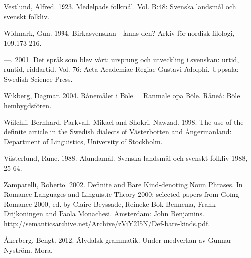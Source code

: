 Vestlund, Alfred. 1923. Medelpads folkmål. Vol. B:48: Svenska landsmål och svenskt folkliv.


Widmark, Gun. 1994. Birkasvenskan - fanns den? Arkiv för nordisk filologi, 109.173-216.


—. 2001. Det språk som blev vårt: ursprung och utveckling i svenskan: urtid, runtid, riddartid. Vol. 76: Acta Academiae Regiae Gustavi Adolphi. Uppsala: Swedish Science Press.


Wikberg, Dagmar. 2004. Rånemålet i Böle = Ranmale opa Böle. Råneå: Böle hembygdsfören.


Wälchli, Bernhard, Parkvall, Mikael and Shokri, Nawzad. 1998. The use of the definite article in the Swedish dialects of Västerbotten and Ångermanland: Department of Linguistics, University of Stockholm.


Västerlund, Rune. 1988. Alundamål. Svenska landsmål och svenskt folkliv 1988, 25-64.


Zamparelli, Roberto. 2002. Definite and Bare Kind-denoting Noun Phrases. In Romance Languages and Linguistic Theory 2000; selected papers from {\textquotesingle}Going Romance{\textquotesingle} 2000, ed. by Claire Beyssade, Reineke Bok-Bennema, Frank Drijkoningen and Paola Monachesi. Amsterdam: John Benjamins. http://semanticsarchive.net/Archive/zViY2I5N/Def-bare-kinds.pdf.


Åkerberg, Bengt. 2012. Älvdalsk grammatik. Under medverkan av Gunnar Nyström. Mora. 


  